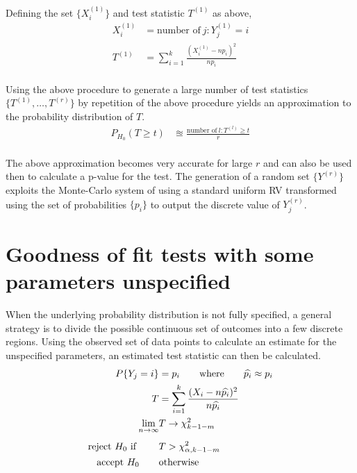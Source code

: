 Defining the set $ \{X_i^{(1)}\} $ and test statistic $ T^{(1)} $ as above, \\

\begin{align}
	X_i^{(1)} &= \text{number of} \ j : Y_j^{(1)} = i \\
	T^{(1)} &= \sum\limits_{i=1}^{k} \frac{(X_i^{(1)} - np_i)^2}{np_i}
\end{align}\\

Using the above procedure to generate a large number of test statistics $ \{T^{(1)}, \dots, T^{(r)}\} $ by repetition of the above procedure yields an approximation to the probability distribution of $ T $.\\

\begin{align}
	P_{H_0} (T \geq t) &\approxeq \frac{\text{number of}\ l : T^{(l)} \geq t}{r}
\end{align}\\

The above approximation becomes very accurate for large $ r $ and can also be used then to calculate a p-value for the test. The generation of a random set $ \{Y^{(r)}\} $ exploits the Monte-Carlo system of using a standard uniform RV transformed using the set of probabilities $ \{p_i\} $ to output the discrete value of $ Y^{(r)}_j $.\\

\section{Goodness of fit tests with some parameters unspecified}

When the underlying probability distribution is not fully specified, a general strategy is to divide the possible continuous set of outcomes into a few discrete regions. Using the observed set of data points to calculate an estimate for the unspecified parameters, an estimated test statistic can then be calculated.\\

\begin{align}
	P\{Y_j = i\} &= p_i \qquad \text{where} \qquad \widehat{p_i} \approx p_i \\
	T &= \sum\limits_{i=1}^{k} \frac{(X_i - n\widehat{p_i})^2}{n\widehat{p_i}} \\
	\lim\limits_{n \to \infty} & T \to \chi^2_{k-1-m} \\[1ex]
	\text{reject $ H_0 $ if } \qquad & T > \chi^2_{\alpha, k-1-m}  \nonumber \\
	\text{accept $ H_0 $} \qquad & \text{otherwise}
\end{align}\\

